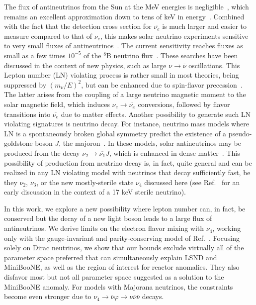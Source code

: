 \documentclass[
reprint,
superscriptaddress,
showpacs,
preprintnumbers,
nofootinbib,
nobibnotes,
amsmath,
amssymb, 
aps,
prd,
floatfix
]{revtex4-1}
\renewcommand{\phi}{\varphi}
\begin{document}
The flux of antineutrinos from the Sun at the MeV energies is negligible~\cite{Malaney:1989hs}, which remains an excellent approximation down to tens of keV in energy~\cite{Vitagliano:2017odj}. Combined with the fact that the detection cross section for $\overline{\nu_e}$ is much larger and easier to measure compared to that of $\nu_e$, this makes solar neutrino experiments sensitive to very small fluxes of antineutrinos~\cite{Akhmedov:1991uk,Barbieri:1991ed,Acker:1992eh}. The current sensitivity reaches fluxes as small as a few times $10^{-5}$ of the $^8$B neutrino flux~\cite{Aharmim:2004uf,Collaboration:2011jza,Agostini:2019yuq,Linyan2018}. These searches have been discussed in the context of new physics, such as large $\nu\to\overline{\nu}$ oscillations. This Lepton number (LN) violating process is rather small in most theories, being suppressed by $(m_\nu/E)^2$, but can be enhanced due to spin-flavor precession~\cite{Lim:1987tk,Akhmedov:1989df}. The latter arises from the coupling of a large neutrino magnetic moment to the solar magnetic field, which induces $\nu_e \to \overline{\nu_x}$ conversions, followed by flavor transitions into $\overline{\nu_e}$ due to matter effects. Another possibility to generate such LN violating signatures is neutrino decay. For instance, neutrino mass models where LN is a spontaneously broken global symmetry predict the existence of a pseudo-goldstone boson $J$, the majoron~\cite{Chikashige:1980ui,Gelmini:1980re}. In these models, solar antineutrinos may be produced from the decay $\nu_2 \to \overline{\nu_1} J$, which is enhanced in dense matter~\cite{Berezhiani:1987gf}. This possibility of production from neutrino decay is, in fact, quite general and can be realized in any LN violating model with neutrinos that decay sufficiently fast, be they $\nu_2$, $\nu_3$, or the new mostly-sterile state $\nu_4$ discussed here (see Ref.~\cite{Berezhiani:1991vk} for an early discussion in the context of a 17 keV sterile neutrino). 

In this work, we explore a new possibility where lepton number can, in fact, be conserved but the decay of a new light boson leads to a large flux of antineutrinos. We derive limits on the electron flavor mixing with $\nu_4$, working only with the gauge-invariant and parity-conserving model of Ref.~\cite{Dentler:2019dhz}. Focusing solely on Dirac neutrinos, we show that our bounds exclude virtually all of the parameter space preferred that can simultaneously explain LSND and MiniBooNE, as well as the region of interest for reactor anomalies. 
They also disfavor most but not all parameter space suggested as a solution to the MiniBooNE anomaly. For models with Majorana neutrinos, the constraints become even stronger due to $\nu_4 \to \overline{\nu} \phi \to \nu \overline{\nu} \overline{\nu}$ decays.
\end{document}
